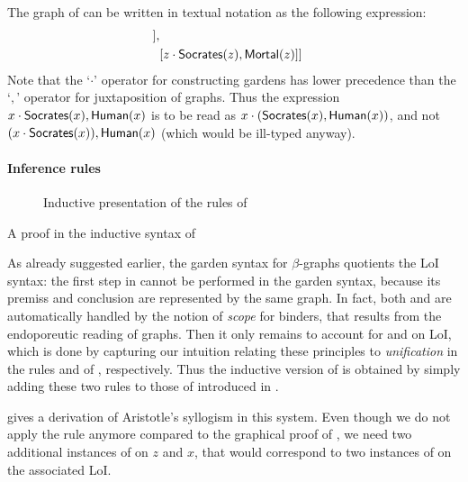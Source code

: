 \begin{example}
  The graph of  can be written in textual
  notation as the following expression:
  \begin{align*}
    [&x \cdot \socrates(x),\human(x), \\
     &[y \cdot \human(y),[{} \cdot \mortal(y)]], \\
     &[z \cdot \socrates(z),\mortal(z)]]
  \end{align*}
  Note that the `$\cdot$' operator for constructing gardens has lower precedence
  than the `$,$' operator for juxtaposition of graphs. Thus the expression $x
  \cdot \mbox{\textsf{Socrates}}(x),\mbox{\textsf{Human}}(x)$ is to be read as $x \cdot
  (\mbox{\textsf{Socrates}}(x),\mbox{\textsf{Human}}(x))$, and not $(x \cdot \mbox{\textsf{Socrates}}(x)),\mbox{\textsf{Human}}(x)$ (which
  would be ill-typed anyway).
\end{example}

\paragraph{Inference rules}

\begin{figure}
  
  \caption{Inductive presentation of the rules of }
\end{figure}

\begin{marginfigure}
  
  \caption{A proof in the inductive syntax of }
\end{marginfigure}

As already suggested earlier, the garden syntax for $\beta$-graphs quotients the
LoI syntax: the first  step in 
cannot be performed in the garden syntax, because its premiss and conclusion are
represented by the same graph. In fact, both  and
 are automatically handled by the notion of \emph{scope} for
binders, that results from the endoporeutic reading of graphs. Then it only
remains to account for  and  on LoI, which is done
by capturing our intuition relating these principles to \emph{unification} in
the rules  and  of , respectively.
Thus the inductive version of  is obtained by simply adding these two
rules to those of  introduced in .

 gives a derivation of Aristotle's syllogism
in this system. Even though we do not apply the  rule anymore compared
to the graphical proof of , we need two additional
instances of  on $z$ and $x$, that would correspond to two
instances of  on the associated LoI.


